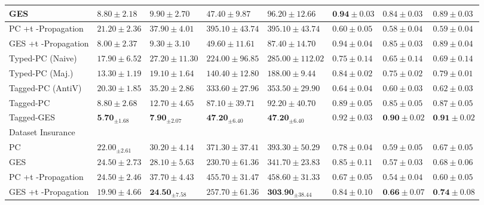 \documentclass[10pt]{article}
\begin{document}
\begin{table}[h]
\begin{center}
\begin{tabular}{|l|l|l|l|l|l|l|l|}
\hline
GES & $8.80 \pm 2.18$ & $9.90 \pm 2.70$ & $47.40 \pm 9.87$ & $96.20 \pm 12.66$ & $\mathbf{0 . 9 4} \pm 0.03$ & $0.84 \pm 0.03$ & $0.89 \pm 0.03$ \\
\hline
PC +t -Propagation & $21.20 \pm 2.36$ & $37.90 \pm 4.01$ & $395.10 \pm 43.74$ & $395.10 \pm 43.74$ & $0.60 \pm 0.05$ & $0.58 \pm 0.04$ & $0.59 \pm 0.04$ \\
\hline
GES +t -Propagation & $8.00 \pm 2.37$ & $9.30 \pm 3.10$ & $49.60 \pm 11.61$ & $87.40 \pm 14.70$ & $0.94 \pm 0.04$ & $0.85 \pm 0.03$ & $0.89 \pm 0.04$ \\
\hline
Typed-PC (Naive) & $17.90 \pm 6.52$ & $27.20 \pm 11.30$ & $224.00 \pm 96.85$ & $285.00 \pm 112.02$ & $0.75 \pm 0.14$ & $0.65 \pm 0.14$ & $0.69 \pm 0.14$ \\
\hline
Typed-PC (Maj.) & $13.30 \pm 1.19$ & $19.10 \pm 1.64$ & $140.40 \pm 12.80$ & $188.00 \pm 9.44$ & $0.84 \pm 0.02$ & $0.75 \pm 0.02$ & $0.79 \pm 0.01$ \\
\hline
Tagged-PC (AntiV) & $20.30 \pm 1.85$ & $35.20 \pm 2.86$ & $333.60 \pm 27.96$ & $353.50 \pm 29.90$ & $0.64 \pm 0.04$ & $0.60 \pm 0.03$ & $0.62 \pm 0.03$ \\
\hline
Tagged-PC & $8.80 \pm 2.68$ & $12.70 \pm 4.65$ & $87.10 \pm 39.71$ & $92.20 \pm 40.70$ & $0.89 \pm 0.05$ & $0.85 \pm 0.05$ & $0.87 \pm 0.05$ \\
\hline
Tagged-GES & $\mathbf{5 . 7 0}_{ \pm 1.68}$ & $\mathbf{7 . 9 0}_{ \pm 2.07}$ & $\mathbf{4 7 . 2 0}_{ \pm 6.40}$ & $\mathbf{4 7 . 2 0}_{ \pm 6.40}$ & $0.92 \pm 0.03$ & $\mathbf{0 . 9 0} \pm 0.02$ & $\mathbf{0 . 9 1} \pm 0.02$ \\
\hline
Dataset Insurance & \multicolumn{7}{|c|}{} \\
\hline
PC & $22.00_{ \pm 2.61}$ & $30.20 \pm 4.14$ & $371.30 \pm 37.41$ & $393.30 \pm 50.29$ & $0.78 \pm 0.04$ & $0.59 \pm 0.05$ & $0.67 \pm 0.05$ \\
\hline
GES & $24.50 \pm 2.73$ & $28.10 \pm 5.63$ & $230.70 \pm 61.36$ & $341.70 \pm 23.83$ & $0.85 \pm 0.11$ & $0.57 \pm 0.03$ & $0.68 \pm 0.06$ \\
\hline
PC +t -Propagation & $24.50 \pm 2.46$ & $37.70 \pm 4.43$ & $455.70 \pm 31.47$ & $458.60 \pm 31.33$ & $0.67 \pm 0.05$ & $0.54 \pm 0.04$ & $0.60 \pm 0.05$ \\
\hline
GES +t -Propagation & $19.90 \pm 4.66$ & $\mathbf{2 4 . 5 0}_{ \pm 7.58}$ & $257.70 \pm 61.36$ & $\mathbf{3 0 3 . 9 0}_{ \pm 38.44}$ & $0.84 \pm 0.10$ & $\mathbf{0 . 6 6} \pm 0.07$ & $\mathbf{0 . 7 4} \pm 0.08$ \\

\end{tabular}
\end{center}
\end{table}
\end{document}
